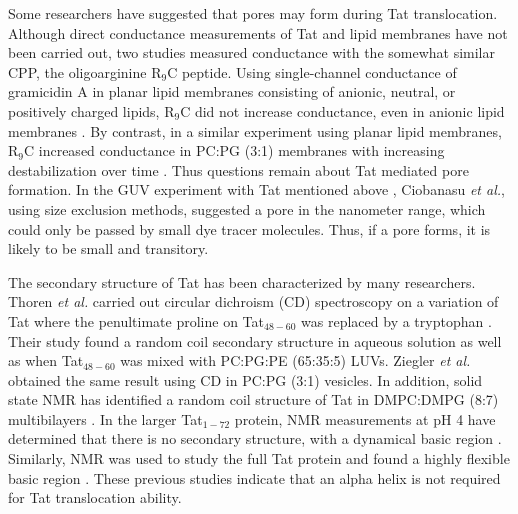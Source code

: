 Some researchers have suggested that pores may form during Tat translocation.
Although direct conductance 
measurements of Tat and lipid membranes have not been carried out, two studies 
measured conductance with the somewhat similar CPP, the oligoarginine R$_9$C peptide. 
Using single-channel conductance of gramicidin A in planar lipid membranes 
consisting of anionic, neutral, or positively charged lipids, R$_9$C did not 
increase conductance, even in anionic lipid membranes \cite{Gurnev13}. 
By contrast, in a similar experiment using planar lipid membranes, 
R$_9$C increased conductance in PC:PG (3:1) membranes with increasing destabilization 
over time \cite{Herce09}. 
Thus questions remain about Tat mediated pore formation. 
In the GUV experiment with Tat mentioned above \cite{Ciobanasu10},
Ciobanasu \textit{et al.}, using size exclusion methods, suggested a pore in the 
nanometer range, which could only be passed by small dye tracer molecules. Thus, 
if a pore forms, it is likely to be small and transitory.

The secondary structure of Tat has been characterized by many researchers. 
Thoren \textit{et al.} carried out circular dichroism (CD) spectroscopy on a 
variation of Tat where the penultimate proline on Tat$_{48-60}$ was replaced by a
tryptophan \cite{Thoren04}. 
Their study found a random coil secondary structure 
in aqueous solution as well as when Tat$_{48-60}$ was mixed with PC:PG:PE (65:35:5) LUVs. 
Ziegler \textit{et al.} \cite{Ziegler05} obtained the same result using CD in 
PC:PG (3:1) vesicles. In addition, solid state NMR has identified a random coil 
structure of Tat in DMPC:DMPG (8:7) multibilayers \cite{Su10}. 
In the larger Tat$_{1-72}$ protein, NMR measurements at pH 4 have determined that there 
is no secondary structure, with a dynamical basic region \cite{Shojania06}. 
Similarly, NMR was used to study the full Tat protein and found a highly 
flexible basic region \cite{Bayer95}. These previous studies indicate that 
an alpha helix is not required for Tat translocation ability. 

